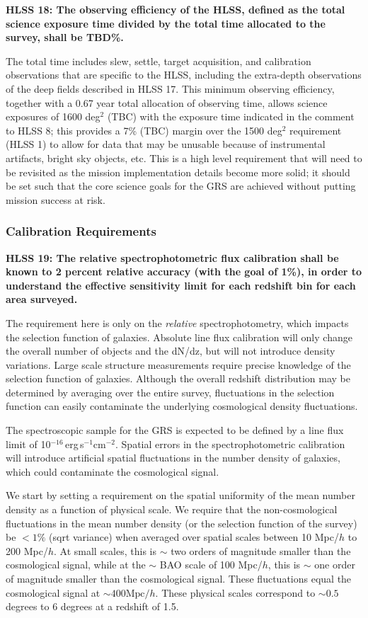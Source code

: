  \noindent
 {\bf HLSS 18: The observing efficiency of the HLSS, defined as the total science
 exposure time divided by the total time allocated to the survey, shall be TBD\%.  }

 The total time includes slew, settle, target acquisition, and
 calibration observations that are specific to the HLSS, including the
 extra-depth observations of the deep fields described in HLSS 17.  This minimum
 observing efficiency, together with a 0.67 year total allocation of observing
 time, allows science exposures of 1600 deg$^2$ (TBC) with the exposure time
 indicated in the comment to HLSS 8; this provides a 7\% (TBC) margin over the
 1500 deg$^2$ requirement (HLSS 1) to allow for data that may be unusable because of
 instrumental artifacts, bright sky objects, etc. This is a high level
 requirement that will need to be revisited as the mission implementation details
 become more solid; it should be set such that the core science goals for the GRS
 are achieved without putting mission success at risk.


 \subsubsection{Calibration Requirements}


 \noindent
 {\bf HLSS 19: The relative spectrophotometric flux calibration shall be known to 2
 percent relative accuracy (with the goal of 1\%), in order to understand the
 effective sensitivity limit for each redshift bin for each area surveyed.}

 The requirement here is only on the {\it relative} spectrophotometry, which impacts
 the selection function of galaxies. Absolute line flux calibration will only
 change the overall number of objects and the dN/dz, but will not introduce
 density variations.  Large scale structure measurements require precise
 knowledge of the selection function of galaxies. Although the overall redshift
 distribution may be determined by averaging over the entire survey, fluctuations
 in the selection function can easily contaminate the underlying cosmological
 density fluctuations.

 The spectroscopic sample for the GRS is expected to be defined by a line flux
 limit of 10$^{-16}\,$erg$\,$s$^{-1}$cm$^{-2}$. Spatial errors in the spectrophotometric calibration
 will introduce artificial spatial fluctuations in the number density of
 galaxies, which could contaminate the cosmological signal.

 We start by setting a requirement on the spatial uniformity of the mean number
 density as a function of physical scale. We require that the non-cosmological
 fluctuations in the mean number density (or the selection function of the
 survey) be $< 1\%$ (sqrt variance) when averaged over spatial scales between 10
 Mpc/$h$ to 200 Mpc/$h$. At small scales, this is $\sim$ two orders of magnitude smaller
 than the cosmological signal, while at the $\sim$ BAO scale of 100 Mpc/$h$, this
 is $\sim$ one
 order of magnitude smaller than the cosmological signal.  These fluctuations
 equal the cosmological signal at $\sim400 \mathrm{Mpc}/h$.  These physical scales correspond
 to $\sim0.5$ degrees to 6 degrees at a redshift of 1.5.

